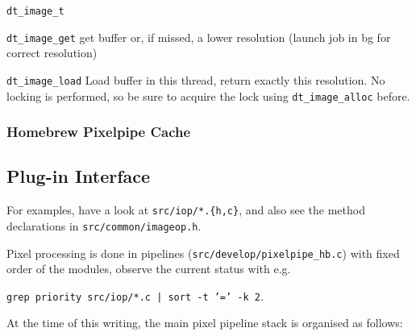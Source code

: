 \documentclass[a4paper,twoside]{scrartcl}
\newcommand{\code}[1]{\texttt{\color{codecol}#1}}
\begin{document}
\code{dt\_image\_t}

\begin{description}
  \item{\code{dt\_image\_get}} get buffer or, if missed, a lower resolution (launch job in bg for correct resolution)
  \item{\code{dt\_image\_load}} Load buffer in this thread, return exactly this resolution.
    No locking is performed, so be sure to acquire the lock using \code{dt\_image\_alloc} before.
\end{description}

\subsubsection{Homebrew Pixelpipe Cache}

\newpage
\subsection{Plug-in Interface}

For examples, have a look at \code{src/iop/*.\{h,c\}}, and also see the method declarations in \code{src/common/imageop.h}.

Pixel processing is done in pipelines (\code{src/develop/pixelpipe\_hb.c}) with fixed order of the modules,
observe the current status with e.g.

\code{grep priority src/iop/*.c | sort -t '=' -k 2}.

At the time of this writing, the main pixel pipeline stack is organised as follows:

\medskip
\end{document}
